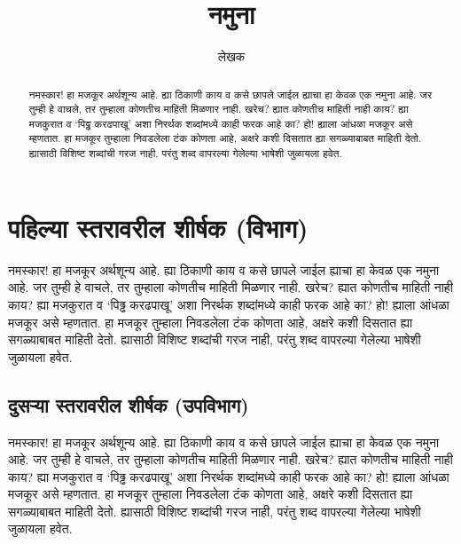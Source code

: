 %
%
\title{नमुना}
\author{लेखक}

\maketitle

\begin{abstract}
नमस्कार! हा मजकूर अर्थशून्य आहे. ह्या ठिकाणी काय व कसे छापले जाईल ह्याचा हा केवळ एक नमुना
आहे. जर तुम्ही हे वाचले, तर तुम्हाला कोणतीच माहिती मिळणार नाही. खरेच? ह्यात कोणतीच माहिती
नाही काय? ह्या मजकुरात व `पिढ्ढ करढपाखू' अशा निरर्थक शब्दांमध्ये काही फरक आहे का? हो!
ह्याला आंधळा मजकूर असे म्हणतात. हा मजकूर तुम्हाला निवडलेला टंक कोणता आहे, अक्षरे कशी दिसतात
ह्या सगळ्याबाबत माहिती देतो. ह्यासाठी विशिष्ट शब्दांची गरज नाही, परंतु शब्द वापरल्या गेलेल्या
भाषेशी जुळायला हवेत.
\end{abstract}

\tableofcontents

\section{पहिल्या स्तरावरील शीर्षक (विभाग)}
नमस्कार! हा मजकूर अर्थशून्य आहे. ह्या ठिकाणी काय व कसे छापले जाईल ह्याचा हा केवळ एक नमुना
आहे. जर तुम्ही हे वाचले, तर तुम्हाला कोणतीच माहिती मिळणार नाही. खरेच? ह्यात कोणतीच माहिती
नाही काय? ह्या मजकुरात व `पिढ्ढ करढपाखू' अशा निरर्थक शब्दांमध्ये काही फरक आहे का? हो!
ह्याला आंधळा मजकूर असे म्हणतात. हा मजकूर तुम्हाला निवडलेला टंक कोणता आहे, अक्षरे कशी दिसतात
ह्या सगळ्याबाबत माहिती देतो. ह्यासाठी विशिष्ट शब्दांची गरज नाही, परंतु शब्द वापरल्या गेलेल्या
भाषेशी जुळायला हवेत.

\subsection{दुसऱ्या स्तरावरील शीर्षक (उपविभाग)}
नमस्कार! हा मजकूर अर्थशून्य आहे. ह्या ठिकाणी काय व कसे छापले जाईल ह्याचा हा केवळ एक नमुना
आहे. जर तुम्ही हे वाचले, तर तुम्हाला कोणतीच माहिती मिळणार नाही. खरेच? ह्यात कोणतीच माहिती
नाही काय? ह्या मजकुरात व `पिढ्ढ करढपाखू' अशा निरर्थक शब्दांमध्ये काही फरक आहे का? हो!
ह्याला आंधळा मजकूर असे म्हणतात. हा मजकूर तुम्हाला निवडलेला टंक कोणता आहे, अक्षरे कशी दिसतात
ह्या सगळ्याबाबत माहिती देतो. ह्यासाठी विशिष्ट शब्दांची गरज नाही, परंतु शब्द वापरल्या गेलेल्या
भाषेशी जुळायला हवेत.

